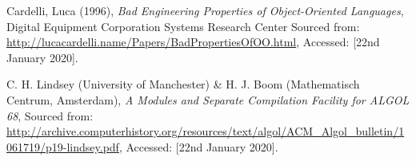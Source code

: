 \documentclass[12pt]{article}
\begin{document}
  \begin{thebibliography}{9}
    Cardelli, Luca (1996),
    \textit{Bad Engineering Properties of Object-Oriented Languages},
    Digital Equipment Corporation Systems Research Center
    Sourced from: \url{http://lucacardelli.name/Papers/BadPropertiesOfOO.html},
    Accessed: [22nd January 2020].

    C. H. Lindsey (University of Manchester) \&
    H. J. Boom (Mathematisch Centrum, Amsterdam),
    \textit{A Modules and Separate Compilation Facility for ALGOL 68},
    Sourced from: \url{http://archive.computerhistory.org/resources/text/algol/ACM_Algol_bulletin/1061719/p19-lindsey.pdf},
    Accessed: [22nd January 2020].


  \end{thebibliography}
\end{document}
